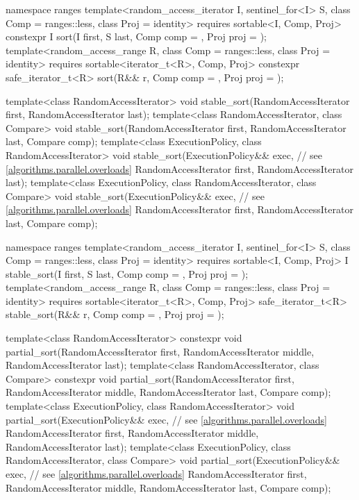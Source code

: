 \begin{codeblock}
{  namespace ranges {
    template<random_access_iterator I, sentinel_for<I> S, class Comp = ranges::less,
             class Proj = identity>
      requires sortable<I, Comp, Proj>
      constexpr I
        sort(I first, S last, Comp comp = {}, Proj proj = {});
    template<random_access_range R, class Comp = ranges::less, class Proj = identity>
      requires sortable<iterator_t<R>, Comp, Proj>
      constexpr safe_iterator_t<R>
        sort(R&& r, Comp comp = {}, Proj proj = {});
  }

  template<class RandomAccessIterator>
    void stable_sort(RandomAccessIterator first, RandomAccessIterator last);
  template<class RandomAccessIterator, class Compare>
    void stable_sort(RandomAccessIterator first, RandomAccessIterator last,
                     Compare comp);
  template<class ExecutionPolicy, class RandomAccessIterator>
    void stable_sort(ExecutionPolicy&& exec,                    // see \ref{algorithms.parallel.overloads}
                     RandomAccessIterator first, RandomAccessIterator last);
  template<class ExecutionPolicy, class RandomAccessIterator, class Compare>
    void stable_sort(ExecutionPolicy&& exec,                    // see \ref{algorithms.parallel.overloads}
                     RandomAccessIterator first, RandomAccessIterator last,
                     Compare comp);

  namespace ranges {
    template<random_access_iterator I, sentinel_for<I> S, class Comp = ranges::less,
             class Proj = identity>
      requires sortable<I, Comp, Proj>
      I stable_sort(I first, S last, Comp comp = {}, Proj proj = {});
    template<random_access_range R, class Comp = ranges::less, class Proj = identity>
      requires sortable<iterator_t<R>, Comp, Proj>
      safe_iterator_t<R>
        stable_sort(R&& r, Comp comp = {}, Proj proj = {});
  }

  template<class RandomAccessIterator>
    constexpr void partial_sort(RandomAccessIterator first,
                                RandomAccessIterator middle,
                                RandomAccessIterator last);
  template<class RandomAccessIterator, class Compare>
    constexpr void partial_sort(RandomAccessIterator first,
                                RandomAccessIterator middle,
                                RandomAccessIterator last, Compare comp);
  template<class ExecutionPolicy, class RandomAccessIterator>
    void partial_sort(ExecutionPolicy&& exec,                   // see \ref{algorithms.parallel.overloads}
                      RandomAccessIterator first,
                      RandomAccessIterator middle,
                      RandomAccessIterator last);
  template<class ExecutionPolicy, class RandomAccessIterator, class Compare>
    void partial_sort(ExecutionPolicy&& exec,                   // see \ref{algorithms.parallel.overloads}
                      RandomAccessIterator first,
                      RandomAccessIterator middle,
                      RandomAccessIterator last, Compare comp);

}
\end{codeblock}
